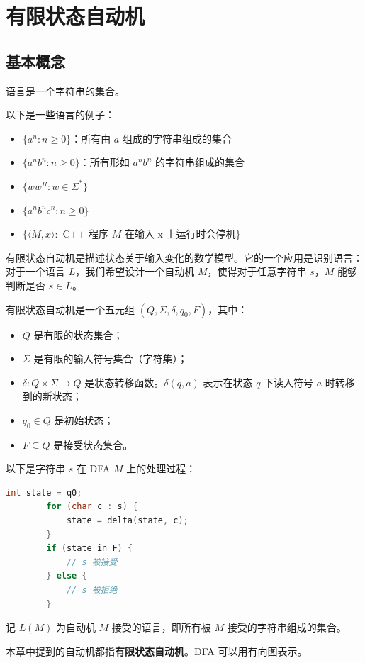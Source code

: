 \chapter{有限状态自动机}

\section{基本概念}

\begin{definition}[语言]
    语言是一个字符串的集合。
\end{definition}
\begin{example}
    以下是一些语言的例子：
    \begin{itemize}
        \item $\{a^n : n \ge 0\}$：所有由 $a$ 组成的字符串组成的集合
        \item $\{a^n b^n : n \ge 0\}$：所有形如 $a^n b^n$ 的字符串组成的集合
        \item $\{ww^R:w\in \Sigma^*\}$
        \item $\{a^nb^nc^n : n\ge 0\}$
        \item $\{\langle M,x\rangle : \text{ C++ 程序 }M\text{ 在输入 x 上运行时会停机}\}$
    \end{itemize}
\end{example}

有限状态自动机是描述状态关于输入变化的数学模型。它的一个应用是识别语言：对于一个语言 $L$，我们希望设计一个自动机 $M$，使得对于任意字符串 $s$，$M$ 能够判断是否 $s\in L$。

\begin{definition}
    有限状态自动机是一个五元组 $(Q,\Sigma,\delta,q_0,F)$，其中：
    \begin{itemize}
        \item $Q$ 是有限的状态集合；
        \item $\Sigma$ 是有限的输入符号集合（字符集）；
        \item $\delta: Q\times \Sigma\to Q$ 是状态转移函数。$\delta(q,a)$ 表示在状态 $q$ 下读入符号 $a$ 时转移到的新状态；
        \item $q_0\in Q$ 是初始状态；
        \item $F\subseteq Q$ 是接受状态集合。
    \end{itemize}
    以下是字符串 $s$ 在 DFA $M$ 上的处理过程：
    \begin{lstlisting}[language=C++]
        int state = q0;
        for (char c : s) {
            state = delta(state, c);
        }
        if (state in F) {
            // s 被接受
        } else {
            // s 被拒绝
        }
    \end{lstlisting}
    记 $L(M)$ 为自动机 $M$ 接受的语言，即所有被 $M$ 接受的字符串组成的集合。
\end{definition}
本章中提到的自动机都指\textbf{有限状态自动机}。DFA 可以用有向图表示。

